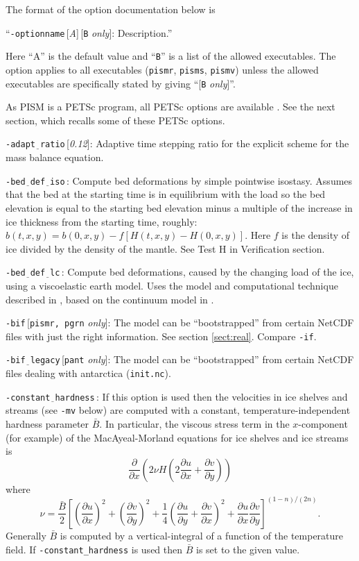 \documentclass[11pt,final]{amsart}
\newcommand{\ddx}[1]{\ensuremath{\frac{\partial #1}{\partial x}}}
\newcommand{\ddy}[1]{\ensuremath{\frac{\partial #1}{\partial y}}}
\renewcommand{\t}[1]{\texttt{#1}}
\newcommand{\rawopt}[1]{\vspace{1mm}\noindent \Large\texttt{-#1}\normalsize}
\newcommand{\opt}[1]{\rawopt{#1}\,:\quad}
\newcommand{\optdef}[2]{\rawopt{#1}\,[\textsl{#2}]:\quad}
\newcommand{\optrestrict}[2]{\rawopt{#1}\,[\texttt{#2} \textsl{only}]:\quad}
\newcommand{\optdefrestrict}[3]{\rawopt{#1}\,[\textsl{#2}]\,[\texttt{#3} \textsl{only}]:\quad}
\newcommand{\und}{$\underline{\,\,\,}$}
\begin{document}
The format of the option documentation below is

\centerline{``\optdefrestrict{optionname}{A}{B} Description.''}

\noindent Here ``A'' is the default value and ``\t{B}'' is a list of the allowed executables.  The option applies to all executables (\verb|pismr|, \verb|pisms|, \verb|pismv|) unless the allowed executables are specifically stated by giving ``[\t{B} \textsl{only}]''.

As PISM is a PETSc program, all PETSc options are available \cite{petsc-user-ref}.  See the next section, which recalls some of these PETSc options.
\bigskip

\optdef{adapt\und ratio}{0.12}  Adaptive time stepping ratio for the explicit scheme for the mass balance equation.

\opt{bed\und def\und iso} Compute bed deformations by simple pointwise isostasy.  Assumes that the bed at the starting time is in equilibrium with the load so the bed elevation is equal to the starting bed elevation minus a multiple of the increase in ice thickness from the starting time, roughly: $b(t,x,y) = b(0,x,y) - f [H(t,x,y) - H(0,x,y)]$.  Here $f$ is the density of ice divided by the density of the mantle.  See Test H in Verification section.

\opt{bed\und def\und lc} Compute bed deformations, caused by the changing load of the ice, using a viscoelastic earth model.  Uses the model and computational technique described in \cite{BLKfastearth}, based on the continuum model in \cite{LingleClark}.

\optrestrict{bif}{pismr, pgrn}  The model can be ``bootstrapped'' from certain NetCDF files with just the right information.  See section \ref{sect:real}.  Compare \verb|-if|.

\optrestrict{bif\und legacy}{pant}  The model can be ``bootstrapped'' from certain NetCDF files dealing with antarctica (\verb|init.nc|).

\opt{constant\und hardness}  If this option is used then the velocities in ice shelves and streams (see \verb|-mv| below) are computed with a constant, temperature-independent hardness parameter $\bar B$.  In particular, the viscous stress term in the $x$-component (for example) of the MacAyeal-Morland equations for ice shelves and ice streams is
	$$\ddx{}\left(2\nu H\left(2\ddx{u} + \ddy{v}\right)\right)$$
where 
	$$\nu = \frac{\bar B}{2} \left[\left(\ddx{u}\right)^2 + \left(\ddy{v}\right)^2 +
  \frac{1}{4} \left(\ddy{u} + \ddx{v}\right)^2 + \ddx{u}\ddy{v}\right]^{(1-n)/(2n)}.$$
Generally $\bar B$ is computed by a vertical-integral of a function of the temperature field.  If \verb|-constant_hardness| is used then $\bar B$ is set to the given value.
\end{document}
